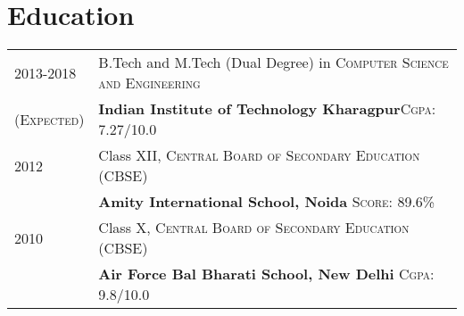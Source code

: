 \documentclass[a4paper,10pt]{extarticle} %
\begin{document}



\section{Education}

\begin{tabular}{R{3.0cm}|p{15.0cm}}	
2013-2018 & B.Tech and M.Tech (Dual Degree) in \textsc{Computer Science and Engineering}\\
\textsc{(Expected)}&\textbf{Indian Institute of Technology Kharagpur}\hfill\textsc{Cgpa}: 7.27/10.0\\



2012& Class XII, \textsc{}\textsc{Central Board of Secondary Education (CBSE)} \\
&\normalsize\textbf{Amity International School, Noida} \hfill\textsc{Score}: 89.6\%\\



2010 & Class X, \textsc{}\textsc{Central Board of Secondary Education (CBSE)} \\
&\normalsize\textbf{Air Force Bal Bharati School, New Delhi} \hfill\textsc{Cgpa}: 9.8/10.0\\

\end{tabular}

\end{document}
